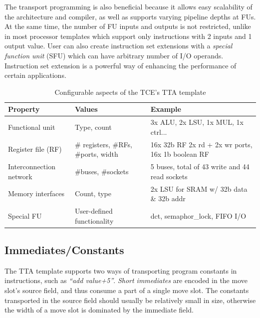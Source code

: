 \documentclass[twoside]{tceusermanual}
\begin{document}
The transport programming is also beneficial because it allows easy
scalability of the architecture and compiler, as well as supports
varying pipeline depths at FUs. At the same time, the number of FU
inputs and outputs is not restricted, unlike in most processor
templates which support only instructions with 2 inputs and 1
output value. User can also create instruction set extensions with a
\textit{special function unit} (SFU) which can have arbitrary number
of I/O operands. Instruction set extension is a powerful way of
enhancing the performance of certain applications.

\begin{table}
  \begin{center}
    \caption {Configurable aspects of the TCE's TTA template}
    \label {tab:filetypes}
    \begin{tabular}{l | l | l }
      \hline
      Property & Values & Example  \\
      \hline
      \hline
      Functional unit         & Type, count                         & 3x ALU, 2x LSU, 1x MUL, 1x ctrl...\\
      Register file (RF)      & \# registers, \#RFs, \#ports, width & 16x 32b RF 2x rd + 2x wr ports, 16x 1b boolean RF \\
      Interconnection network & \#buses, \#sockets                & 5 buses, total of 43 write and 44 read sockets\\
      Memory interfaces       & Count, type                       & 2x LSU for SRAM w/ 32b data \& 32b addr \\
      Special FU              & User-defined functionality        & dct, semaphor\_lock, FIFO I/O \\
      \hline
    \end{tabular}
  \end{center}
\end{table}

\subsection{Immediates/Constants}

The TTA template supports two ways of transporting program constants
in instructions, such as \textit{``add value+5''}. \textit{Short
  immediates} are encoded in the move slot's source field, and thus
consume a part of a single move slot. The constants transported in the
source field should usually be relatively small in size, otherwise the
width of a move slot is dominated by the immediate field.
\end{document}
